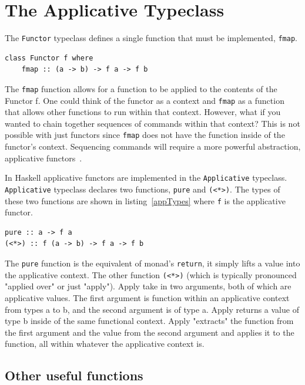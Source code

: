 \section{The Applicative Typeclass}
\label{sec:appOverview}

The \texttt{Functor} typeclass defines a single function that must be implemented, \texttt{fmap}.

\begin{lstlisting}[frame=tblr]
class Functor f where
	fmap :: (a -> b) -> f a -> f b
\end{lstlisting}

The \texttt{fmap} function allows for a function to be applied to the contents of the Functor f. One could think of the functor as a context and \texttt{fmap} as a function that allows other functions to run within that context. However, what if you wanted to chain together sequences of commands within that context? This is not possible with just functors since \texttt{fmap} does not have the function inside of the functor's context. Sequencing commands will require a more powerful abstraction, applicative functors~\citep{realWorldHaskell}. 

In Haskell applicative functors are implemented in the \texttt{Applicative} typeclass. \texttt{Applicative} typeclass declares two functions, \texttt{pure} and \texttt{(<*>)}. The types of these two functions are shown in listing~\ref{appTypes} where \texttt{f} is the applicative functor. 

\begin{lstlisting}[frame=tblr,label=appTypes,caption={Types of Applicative's minimal complete definition}]
pure :: a -> f a
(<*>) :: f (a -> b) -> f a -> f b
\end{lstlisting}

The \texttt{pure} function is the equivalent of monad's \texttt{return}, it simply lifts a value into the applicative context. The other function \texttt{(<*>)} (which is typically pronounced "applied over" or just "apply"). Apply take in two arguments, both of which are applicative values. The first argument is function within an applicative context from types a to b, and the second argument is of type a. Apply returns a value of type b inside of the same functional context. Apply "extracts" the function from the first argument and the value from the second argument and applies it to the function, all within whatever the applicative context is.

\subsection{Other useful functions}

